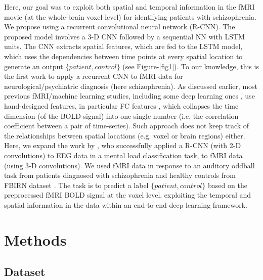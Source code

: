 \documentclass{article}
\begin{document}
Here, our goal was to exploit both spatial and temporal information in the fMRI movie (at the whole-brain voxel level) for identifying patients with schizophrenia. We propose using a recurrent convolutional neural network (R-CNN). The proposed model involves a 3-D CNN followed by a sequential NN with LSTM units. The CNN extracts spatial features, which are fed to the LSTM model, which uses the dependencies between time points at every spatial location to generate an output $\{patient, control\}$ (see Figure-\ref{fig1}). To our knowledge, this is the first work to apply a recurrent CNN to fMRI data for neurological/psychiatric diagnosis (here schizophrenia). As discussed earlier, most previous fMRI/machine learning studies, including some deep learning ones \citep{Kim2016}, use hand-designed features, in particular FC features \citep{Gheiratmand2017}, which collapses the time dimension (of the BOLD signal) into one single number (i.e. the correlation coefficient between a pair of time-series). Such approach does not keep track of the relationships between spatial locations (e.g. voxel or brain regions) either. Here, we expand the work by \citep{Bashivan2016}, who successfully applied a R-CNN (with 2-D convolutions) to EEG data in a mental load classification task, to fMRI data (using 3-D convolutions). %
We used fMRI data in response to an auditory oddball task from patients diagnosed with schizophrenia and healthy controls from FBIRN dataset \citep{Keator2016}. The task is to predict a label $\{patient, control\}$ based on the preprocessed fMRI BOLD signal at the voxel level, exploiting the temporal and spatial information in the data within an end-to-end deep learning framework.

\section{Methods}

\subsection{Dataset}
\end{document}
